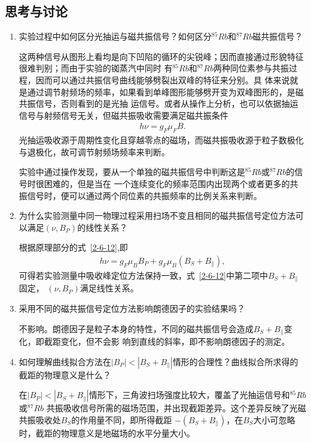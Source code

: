 \documentclass[11pt,a4paper]{article}
\begin{document}
\begin{spacing}{1.3}
\begin{CJK*}{UTF8}{gbsn}
\section{思考与讨论}
\begin{enumerate}
\item 实验过程中如何区分光抽运与磁共振信号？如何区分$^{85}Rb$和$^{87}Rb$磁共振信号？\par 
这两种信号从图形上看均是向下凹陷的循环的尖锐峰；因而直接通过形貌特征很难判别；而由于实验的铷蒸汽中同时
有$^{85}Rb$和$^{87}Rb$两种同位素参与共振过程，因而可以通过共振信号曲线能够劈裂出双峰的特征来分别。具
体来说就是通过调节射频场的频率，如果看到单峰图形能够劈开变为双峰图形的，是磁共振信号，否则看到的是光抽
运信号。或者从操作上分析，也可以依据抽运信号与射频信号无关，但磁共振吸收需要满足磁共振条件
\begin{eqnarray} 
h\nu = g_F\mu_FB.
\end{eqnarray}
光抽运吸收源于周期性变化且穿越零点的磁场，而磁共振吸收源于粒子数极化与退极化，故可调节射频场频率来判断。\par
实验中通过操作发现，要从一个单独的磁共振信号中判断这是$^{85}Rb$或$^{87}Rb$的信号时很困难的，但是当在
一个连续变化的频率范围内出现两个或者更多的共振信号时，便可以通过两个同位素的共振频率的比例关系来判断。\par 
\item 为什么实验测量中同一物理过程采用扫场不变且相同的磁共振信号定位方法可以满足$(\nu,B_P)$的线性关系？\par 
根据原理部分的式~\eqref{2-6-12},即
\begin{eqnarray} 
h\nu=g_F\mu_BB_P+g_F\mu_B(B_S+B_{\parallel}),
\end{eqnarray}
可得若实验测量中吸收峰定位方法保持一致，式~\eqref{2-6-12}中第二项中$B_S+B_{\parallel}$固定，
$(\nu,B_P)$满足线性关系。
\item  采用不同的磁共振信号定位方法影响朗德因子的实验结果吗？\par 
不影响。朗德因子是粒子本身的特性，不同的磁共振信号会造成$B_S+B_{\parallel}$变化，即截距变化，但不会影
响到直线的斜率，即不影响朗德因子的测定。
\item  如何理解曲线拟合方法在$|B_P|<|B_S+B_{\parallel}|$情形的合理性？曲线拟合所求得的截距的物理意义是什么？\par 
在$|B_P|<|B_S+B_{\parallel}|$情形下，三角波扫场强度比较大，覆盖了光抽运信号和$^{85}Rb$或$^{87}Rb$
共振吸收信号所需的磁场范围，并出现截距差异。这个差异反映了光磁共振吸收处$B_S$的作用量不同，即所得截距
$-(B_S+B_{\parallel})$，在$B_S$大小可忽略时，截距的物理意义是地磁场的水平分量大小。

\end{enumerate}
\end{CJK*}
\end{spacing}
\end{document}
